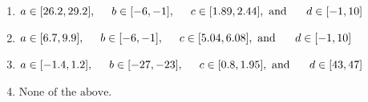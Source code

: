 \documentclass[14pt]{extbook}
\begin{document}
\begin{enumerate}
{\begin{enumerate}[label=\Alph*.]
\item \( a \in [26.2, 29.2], \hspace*{5mm} b \in [-6, -1], \hspace*{5mm} c \in [1.89, 2.44], \text{ and } \hspace*{5mm} d \in [-1, 10] \)
\item \( a \in [6.7, 9.9], \hspace*{5mm} b \in [-6, -1], \hspace*{5mm} c \in [5.04, 6.08], \text{ and } \hspace*{5mm} d \in [-1, 10] \)
\item \( a \in [-1.4, 1.2], \hspace*{5mm} b \in [-27, -23], \hspace*{5mm} c \in [0.8, 1.95], \text{ and } \hspace*{5mm} d \in [43, 47] \)
\item \( \text{None of the above.} \)


\end{enumerate}}
\end{enumerate}
\end{document}

